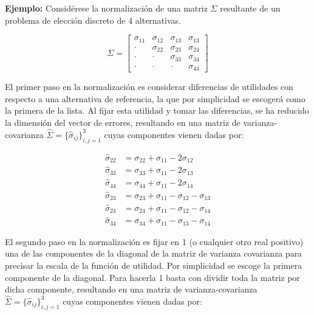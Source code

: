 \documentclass[
]{book}
\begin{document}
\textbf{Ejemplo:} Considérese la normalización de una matriz \(\Sigma\) resultante de un problema de elección discreto de 4 alternativas.

\begin{equation} 
  \Sigma = \begin{bmatrix} \sigma_{11} & \sigma_{12} & \sigma_{13} & \sigma_{13}\\
 \cdot & \sigma_{22} & \sigma_{23} & \sigma_{24}\\
 \cdot & \cdot & \sigma_{33} & \sigma_{34}\\
 \cdot & \cdot & \cdot & \sigma_{44}
\end{bmatrix} 
  \label{eq:matrixcuatro}
\end{equation}

El primer paso en la normalización es considerar diferencias de utilidades con respecto a una alternativa de referencia, la que por simplicidad se escogerá como la primera de la lista. Al fijar esta utilidad y tomar las diferencias, se ha reducido la dimensión del vector de errores, resultando en una matriz de varianza-covarianza \(\hat{Σ} = \{\hat{σ}_{ij}\}^3_{i,j=1}\) cuyas componentes vienen dadas por:

\[
\begin{aligned}
\hat{\sigma}_{22} &= \sigma_{22} + \sigma_{11} - 2\sigma_{12}\\
\hat{\sigma}_{33} &= \sigma_{33} + \sigma_{11} - 2\sigma_{13}\\
\hat{\sigma}_{44} &= \sigma_{44} + \sigma_{11} - 2\sigma_{14}\\
\hat{\sigma}_{23} &= \sigma_{23} + \sigma_{11} - \sigma_{12} - \sigma_{13}\\
\hat{\sigma}_{24} &= \sigma_{24} + \sigma_{11} - \sigma_{12} - \sigma_{14}\\
\hat{\sigma}_{34} &= \sigma_{34} + \sigma_{11} - \sigma_{13} - \sigma_{14}
\end{aligned}
\]

El segundo paso en la normalización es fijar en 1 (o cualquier otro real positivo) una de las componentes de la diagonal de la matriz de varianza covarianza para precisar la escala de la función de utilidad. Por simplicidad se escoge la primera componente de la diagonal. Para hacerla 1 basta con dividir toda la matriz por dicha componente, resultando en una matriz de varianza-covarianza \(\hat{Σ} = \{\hat{σ}_{ij}\}^3_{i,j=1}\) cuyas componentes vienen dadas por:
\end{document}
